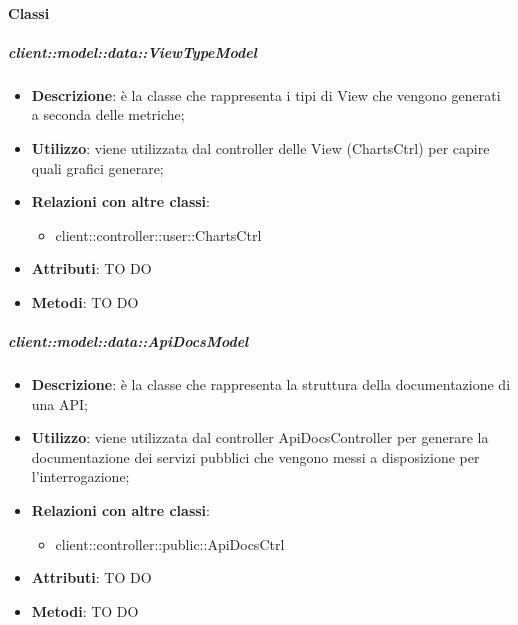 	\paragraph{Classi} %
		\subparagraph{client::model::data::ViewTypeModel} %
		\label{subp:client_model_data_viewtypemodel}
			\begin{itemize}
				\item \textbf{Descrizione}: è la classe che rappresenta i tipi di View che vengono generati a seconda delle metriche;
				\item \textbf{Utilizzo}: viene utilizzata dal controller delle View (ChartsCtrl) per capire quali grafici generare;
				\item \textbf{Relazioni con altre classi}:
					\begin{itemize}
						\item client::controller::user::ChartsCtrl
					\end{itemize}
				\item \textbf{Attributi}: TO DO
				\item \textbf{Metodi}: TO DO
			\end{itemize}

		\subparagraph{client::model::data::ApiDocsModel} %
		\label{subp:client_model_data_apidocsmodel}
			\begin{itemize}
				\item \textbf{Descrizione}: è la classe che rappresenta la struttura della documentazione di una API;
				\item \textbf{Utilizzo}: viene utilizzata dal controller ApiDocsController per generare la documentazione dei servizi pubblici che vengono messi a disposizione per l'interrogazione;
				\item \textbf{Relazioni con altre classi}:
					\begin{itemize}
						\item client::controller::public::ApiDocsCtrl
					\end{itemize}
				\item \textbf{Attributi}: TO DO
				\item \textbf{Metodi}: TO DO					
			\end{itemize}


